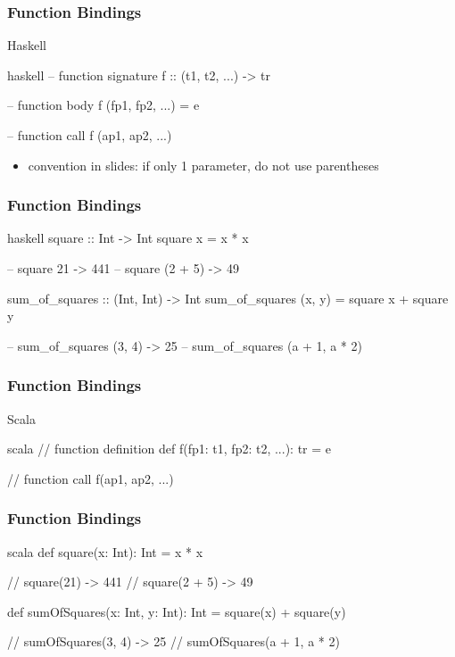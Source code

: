 \documentclass[dvipsnames]{beamer}
\theoremstyle{plain}
\begin{document}
\begin{frame}[fragile]
  \frametitle{Function Bindings}

  \begin{block}{Haskell}
    \begin{pygments}{haskell}
-- function signature
f :: (t1, t2, ...) -> tr

-- function body
f (fp1, fp2, ...) = e

-- function call
f (ap1, ap2, ...)
    \end{pygments}
  \end{block}

  \pause
  \begin{itemize}
    \item convention in slides: if only 1 parameter, do not use parentheses
  \end{itemize}
\end{frame}

\begin{frame}[fragile]
  \frametitle{Function Bindings}

  \begin{example}[Haskell]
    \begin{pygments}{haskell}
square :: Int -> Int
square x = x * x

-- square 21 -> 441
-- square (2 + 5) -> 49

sum_of_squares :: (Int, Int) -> Int
sum_of_squares (x, y) = square x + square y

-- sum_of_squares (3, 4) -> 25
-- sum_of_squares (a + 1, a * 2)
    \end{pygments}
  \end{example}
\end{frame}

\begin{frame}[fragile]
  \frametitle{Function Bindings}

  \begin{block}{Scala}
    \begin{pygments}{scala}
// function definition
def f(fp1: t1, fp2: t2, ...): tr = e

// function call
f(ap1, ap2, ...)
    \end{pygments}
  \end{block}
\end{frame}

\begin{frame}[fragile]
  \frametitle{Function Bindings}

  \begin{example}[Scala]
    \begin{pygments}{scala}
def square(x: Int): Int = x * x

// square(21) -> 441
// square(2 + 5) -> 49

def sumOfSquares(x: Int, y: Int): Int =
    square(x) + square(y)

// sumOfSquares(3, 4) -> 25
// sumOfSquares(a + 1, a * 2)
    \end{pygments}
  \end{example}
\end{frame}
\end{document}

